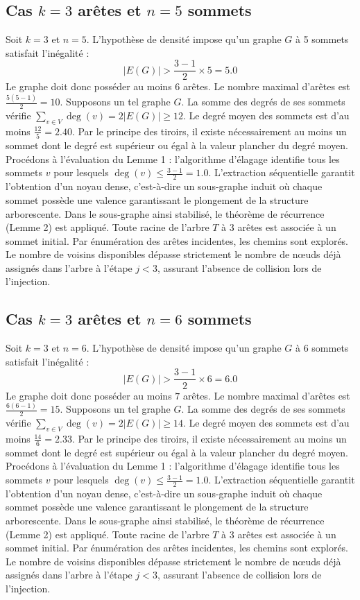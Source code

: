\documentclass[12pt,a4paper]{article}
\begin{document}
\subsection{Cas $k = 3$ arêtes et $n = 5$ sommets}
Soit $k = 3$ et $n = 5$. L'hypothèse de densité impose qu'un graphe $G$ à 5 sommets satisfait l'inégalité :
$$ |E(G)| > \frac{3-1}{2} \times 5 = 5.0 $$
Le graphe doit donc posséder au moins $6$ arêtes. Le nombre maximal d'arêtes est $\frac{5(5-1)}{2} = 10$.
Supposons un tel graphe $G$. La somme des degrés de ses sommets vérifie $\sum_{v \in V} \deg(v) = 2|E(G)| \geq 12$.
Le degré moyen des sommets est d'au moins $\frac{12}{5} = 2.40$.
Par le principe des tiroirs, il existe nécessairement au moins un sommet dont le degré est supérieur ou égal à la valeur plancher du degré moyen.
Procédons à l'évaluation du Lemme 1 : l'algorithme d'élagage identifie tous les sommets $v$ pour lesquels $\deg(v) \leq \frac{3-1}{2} = 1.0$.
L'extraction séquentielle garantit l'obtention d'un noyau dense, c'est-à-dire un sous-graphe induit où chaque sommet possède une valence garantissant le plongement de la structure arborescente.
Dans le sous-graphe ainsi stabilisé, le théorème de récurrence (Lemme 2) est appliqué. Toute racine de l'arbre $T$ à 3 arêtes est associée à un sommet initial. Par énumération des arêtes incidentes, les chemins sont explorés. Le nombre de voisins disponibles dépasse strictement le nombre de nœuds déjà assignés dans l'arbre à l'étape $j < 3$, assurant l'absence de collision lors de l'injection.

\subsection{Cas $k = 3$ arêtes et $n = 6$ sommets}
Soit $k = 3$ et $n = 6$. L'hypothèse de densité impose qu'un graphe $G$ à 6 sommets satisfait l'inégalité :
$$ |E(G)| > \frac{3-1}{2} \times 6 = 6.0 $$
Le graphe doit donc posséder au moins $7$ arêtes. Le nombre maximal d'arêtes est $\frac{6(6-1)}{2} = 15$.
Supposons un tel graphe $G$. La somme des degrés de ses sommets vérifie $\sum_{v \in V} \deg(v) = 2|E(G)| \geq 14$.
Le degré moyen des sommets est d'au moins $\frac{14}{6} = 2.33$.
Par le principe des tiroirs, il existe nécessairement au moins un sommet dont le degré est supérieur ou égal à la valeur plancher du degré moyen.
Procédons à l'évaluation du Lemme 1 : l'algorithme d'élagage identifie tous les sommets $v$ pour lesquels $\deg(v) \leq \frac{3-1}{2} = 1.0$.
L'extraction séquentielle garantit l'obtention d'un noyau dense, c'est-à-dire un sous-graphe induit où chaque sommet possède une valence garantissant le plongement de la structure arborescente.
Dans le sous-graphe ainsi stabilisé, le théorème de récurrence (Lemme 2) est appliqué. Toute racine de l'arbre $T$ à 3 arêtes est associée à un sommet initial. Par énumération des arêtes incidentes, les chemins sont explorés. Le nombre de voisins disponibles dépasse strictement le nombre de nœuds déjà assignés dans l'arbre à l'étape $j < 3$, assurant l'absence de collision lors de l'injection.
\end{document}
